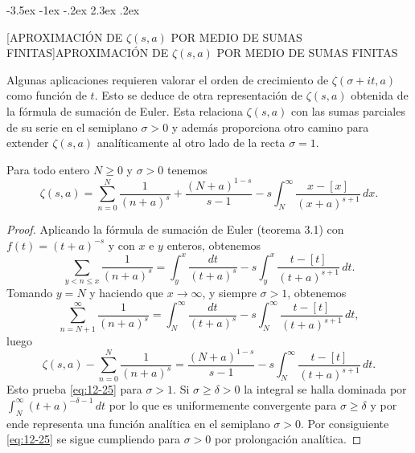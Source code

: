 \documentclass[12pt,a4paper]{book}
\makeatletter
\renewcommand\section{\@startsection{section}{1}{\z@}%
  {-3.5ex \@plus -1ex \@minus -.2ex}%
  {2.3ex \@plus .2ex}%
  {\normalfont\Large\bfseries\raggedright}}
\makeatother
\begin{document}
    \section[APROXIMACIÓN DE \texorpdfstring{$\zeta(s,a)$}{ζ(s,a)} POR MEDIO DE SUMAS FINITAS]{APROXIMACIÓN DE \texorpdfstring{$\zeta(s,a)$}{ζ(s,a)} POR MEDIO DE SUMAS FINITAS}

    Algunas aplicaciones requieren valorar el orden de crecimiento de $\zeta(\sigma+it,a)$ como
    función de $t$. Esto se deduce de otra representación de $\zeta(s,a)$ obtenida de la
    fórmula de sumación de Euler. Esta relaciona $\zeta(s,a)$ con las sumas parciales de su
    serie en el semiplano $\sigma>0$ y además proporciona otro camino para extender
    $\zeta(s,a)$ analíticamente al otro lado de la recta $\sigma=1$.

    \begin{teorema}\label{teo:12-21}
        Para todo entero $N\geq0$ y $\sigma>0$ tenemos
        \begin{equation}\label{eq:12-25}
            \zeta(s,a)=\sum_{n=0}^{N}\frac{1}{(n+a)^{s}}+\frac{(N+a)^{1-s}}{s-1}-s\int_{N}^{\infty}\frac{x-[x]}{(x+a)^{s+1}}\,dx.
        \end{equation}
    \end{teorema}

    \begin{proof}
        Aplicando la fórmula de sumación de Euler (teorema 3.1) con $f(t)=(t+a)^{-s}$ y con $x$
        e $y$ enteros, obtenemos
        \begin{equation*}
            \sum_{y<n\leq x}\frac{1}{(n+a)^{s}}=\int_{y}^{x}\frac{dt}{(t+a)^{s}}-s\int_{y}^{x}\frac{t-[t]}{(t+a)^{s+1}}\,dt.
        \end{equation*}
        Tomando $y=N$ y haciendo que $x\to\infty$, y siempre $\sigma>1$, obtenemos
        \begin{equation*}
            \sum_{n=N+1}^{\infty}\frac{1}{(n+a)^{s}}=\int_{N}^{\infty}\frac{dt}{(t+a)^{s}}-s\int_{N}^{\infty}\frac{t-[t]}{(t+a)^{s+1}}\,dt,
        \end{equation*}
        luego
        \begin{equation*}
            \zeta(s,a)-\sum_{n=0}^{N}\frac{1}{(n+a)^{s}}=\frac{(N+a)^{1-s}}{s-1}-s\int_{N}^{\infty}\frac{t-[t]}{(t+a)^{s+1}}\,dt.
        \end{equation*}
        Esto prueba \eqref{eq:12-25} para $\sigma>1$. Si $\sigma\geq\delta>0$ la integral se
        halla dominada por $\int_{N}^{\infty}(t+a)^{-\delta-1}\,dt$ por lo que es uniformemente
        convergente para $\sigma\geq\delta$ y por ende representa una función analítica en el
        semiplano $\sigma>0$. Por consiguiente \eqref{eq:12-25} se sigue cumpliendo para
        $\sigma>0$ por prolongación analítica.
    \end{proof}
\end{document}
